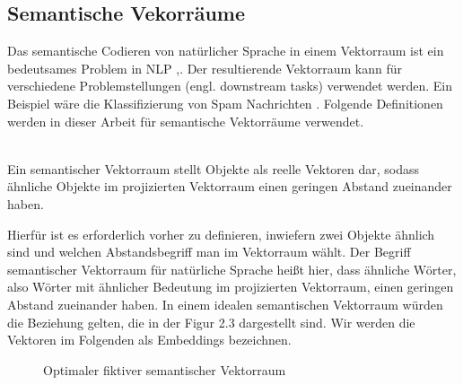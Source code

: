 \documentclass[12pt,letterpaper,ngerman]{article}
\begin{document}
\subsection{Semantische Vekorräume}
Das semantische Codieren von natürlicher Sprache in einem Vektorraum 
ist ein bedeutsames Problem in NLP
\cite{word2vec} ,\cite{reimers-2019-sentence-bert}.
Der resultierende Vektorraum kann
für verschiedene Problemstellungen (engl. downstream tasks) verwendet
werden. Ein Beispiel wäre die Klassifizierung von Spam Nachrichten 
\cite{Ball2019}. Folgende Definitionen werden in dieser Arbeit 
für semantische Vektorräume verwendet.
\begin{definition}
  \hfill\\
  Ein semantischer Vektorraum stellt Objekte als reelle Vektoren 
  dar, sodass ähnliche Objekte im projizierten 
  Vektorraum einen geringen Abstand zueinander haben.
\end{definition}
Hierfür ist es erforderlich vorher zu definieren, inwiefern zwei
Objekte ähnlich sind und welchen Abstandsbegriff man im Vektorraum 
wählt.
Der Begriff semantischer Vektorraum für natürliche Sprache heißt
hier, dass ähnliche Wörter, also Wörter mit ähnlicher Bedeutung 
im projizierten Vektorraum, einen geringen Abstand zueinander haben.  
In einem idealen semantischen Vektorraum würden
die Beziehung gelten, die in der Figur 2.3 dargestellt sind.
Wir werden die Vektoren im Folgenden als Embeddings bezeichnen.
\begin{figure}
  \begin{center}
  \end{center}
  \caption{Optimaler fiktiver semantischer Vektorraum}
\end{figure}
\end{document}
